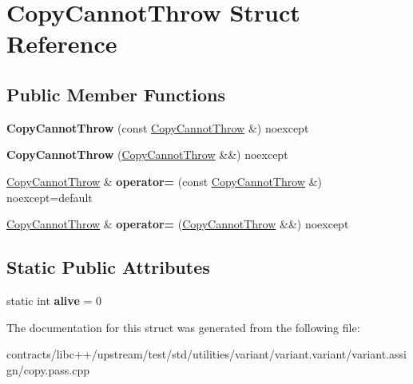 \hypertarget{struct_copy_cannot_throw}{}\section{Copy\+Cannot\+Throw Struct Reference}
\label{struct_copy_cannot_throw}
\subsection*{Public Member Functions}
\begin{DoxyCompactItemize}
\item 
\mbox{\label{struct_copy_cannot_throw_a860aa8f6c6775fc289a706a9624bf4b3}} 
{\bfseries Copy\+Cannot\+Throw} (const \mbox{\hyperlink{struct_copy_cannot_throw}{Copy\+Cannot\+Throw}} \&) noexcept
\item 
\mbox{\label{struct_copy_cannot_throw_a45cabbc5752a286f53b3f84961e4ad92}} 
{\bfseries Copy\+Cannot\+Throw} (\mbox{\hyperlink{struct_copy_cannot_throw}{Copy\+Cannot\+Throw}} \&\&) noexcept
\item 
\mbox{\label{struct_copy_cannot_throw_a76c5f991229015eb0fb3e8db7a2c3af0}} 
\mbox{\hyperlink{struct_copy_cannot_throw}{Copy\+Cannot\+Throw}} \& {\bfseries operator=} (const \mbox{\hyperlink{struct_copy_cannot_throw}{Copy\+Cannot\+Throw}} \&) noexcept=default
\item 
\mbox{\label{struct_copy_cannot_throw_a575999eb8b11b5b40420b35c0c120d63}} 
\mbox{\hyperlink{struct_copy_cannot_throw}{Copy\+Cannot\+Throw}} \& {\bfseries operator=} (\mbox{\hyperlink{struct_copy_cannot_throw}{Copy\+Cannot\+Throw}} \&\&) noexcept
\end{DoxyCompactItemize}
\subsection*{Static Public Attributes}
\begin{DoxyCompactItemize}
\item 
\mbox{\label{struct_copy_cannot_throw_a97f471e6af4543aacf30bfc7cb5cda6c}} 
static int {\bfseries alive} = 0
\end{DoxyCompactItemize}


The documentation for this struct was generated from the following file\+:\begin{DoxyCompactItemize}
\item 
contracts/libc++/upstream/test/std/utilities/variant/variant.\+variant/variant.\+assign/copy.\+pass.\+cpp\end{DoxyCompactItemize}
